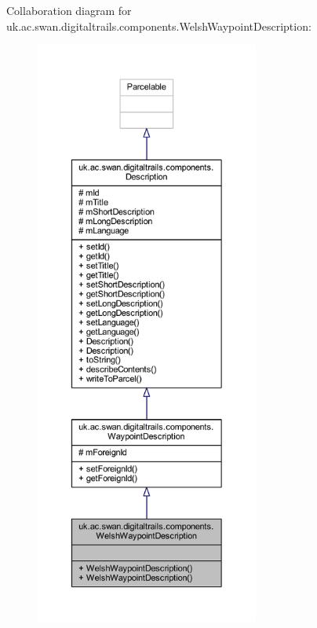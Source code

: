 Collaboration diagram for uk.\+ac.\+swan.\+digitaltrails.\+components.\+Welsh\+Waypoint\+Description\+:
\nopagebreak
\begin{figure}[H]
\begin{center}
\leavevmode
\includegraphics[height=550pt]{classuk_1_1ac_1_1swan_1_1digitaltrails_1_1components_1_1_welsh_waypoint_description__coll__graph}
\end{center}
\end{figure}
